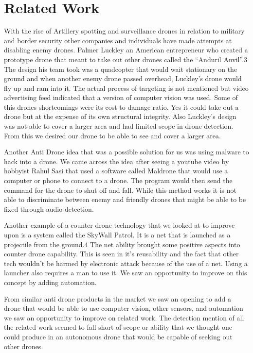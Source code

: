 \documentclass[10pt]{article}
\begin{document}
\section{Related Work}
With the rise of Artillery spotting and surveillance drones in relation to military and border security other companies and individuals have made attempts at disabling enemy drones. Palmer Luckley an American entrepreneur who created a prototype drone that meant to take out other drones called the ``Anduril Anvil''.3 The design his team took was a quadcopter that would wait stationary on the ground and when another enemy drone passed overhead, Luckley's drone would fly up and ram into it. The actual process of targeting is not mentioned but video advertising feed indicated that a version of computer vision was used. Some of this drones shortcomings were its cost to damage ratio. Yes it could take out a drone but at the expense of its own structural integrity. Also Luckley’s design was not able to cover a larger area and had limited scope in drone detection. From this we desired our drone to be able to see and cover a larger area.

Another Anti Drone idea that was a possible solution for us was using malware to hack into a drone. We came across the idea after seeing a youtube video by hobbyist Rahul Sasi that used a software called Maldrone that would use a computer or phone to connect to a drone. The program would then send the command for the drone to shut off and fall. While this method works it is not able to discriminate between enemy and friendly drones that might be able to be fixed through audio detection.

Another example of a counter drone technology that we looked at to improve upon is a system called the SkyWall Patrol. It is a net that is launched as a projectile from the ground.4 The net ability brought some positive aspects into counter drone capability. This is seen in it’s reusability and the fact that other tech wouldn’t be harmed by electronic attack because of the use of a net. Using a launcher also requires a man to use it. We saw an opportunity to improve on this concept by adding automation.

From similar anti drone products in the market we saw an opening to add a drone that would be able to use computer vision, other sensors, and automation we saw an opportunity to improve on related work. The detection mention of all the related work seemed to fall short of scope or ability that we thought one could produce in an autonomous drone that would be capable of seeking out other drones. 
\end{document}
